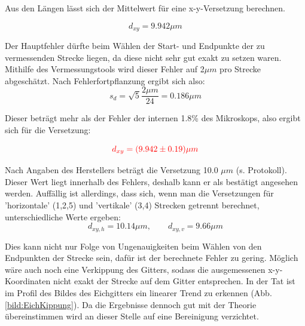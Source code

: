 Aus den Längen lässt sich der Mittelwert für eine x-y-Versetzung berechnen.

\begin{equation*}
    d_{xy} = 9.942 \mu m
\end{equation*}

Der Hauptfehler dürfte beim Wählen der Start- und Endpunkte 
der zu vermessenden Strecke liegen, da diese nicht sehr gut exakt zu setzen waren. Mithilfe des Vermessungstools wird dieser Fehler auf 
2$\mu m$ pro Strecke abgeschätzt. Nach Fehlerfortpflanzung ergibt sich also:
\begin{equation*}
    s_d = \sqrt{5}\frac{2 \mu m}{24} = 0.186 \mu m
\end{equation*}

Dieser beträgt mehr als der Fehler der internen 1.8\% des Mikroskops, also ergibt sich für die Versetzung:

\begin{equation*}
    \textcolor{red}{d_{xy} = (9.942 \pm 0.19) \mu m}
\end{equation*}

Nach Angaben des Herstellers beträgt die Versetzung 10.0 $\mu m$ (s. Protokoll). 
Dieser Wert liegt innerhalb des Fehlers, deshalb kann er als bestätigt angesehen werden. Auffällig ist allerdings, dass sich, 
wenn man die Versetzungen für 'horizontale' (1,2,5) und 'vertikale' (3,4) Strecken getrennt berechnet, unterschiedliche Werte ergeben: 
\begin{equation*}
    d_{xy,h} = 10.14 \mu m, \qquad d_{xy,v} = 9.66 \mu m
\end{equation*}

Dies kann nicht nur Folge von Ungenauigkeiten beim Wählen von den Endpunkten der Strecke sein, dafür ist der berechnete Fehler zu gering. 
Möglich wäre auch noch eine Verkippung des Gitters, sodass die ausgemessenen x-y-Koordinaten nicht exakt der Strecke auf dem Gitter 
entsprechen. In der Tat ist im Profil des Bildes des Eichgitters ein linearer Trend zu erkennen (Abb. \ref{bild:EichKippung}). 
Da die Ergebnisse dennoch gut mit der Theorie übereinstimmen wird an dieser Stelle auf eine Bereinigung verzichtet.

